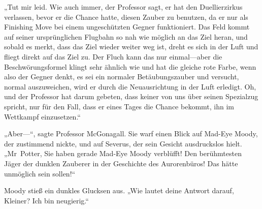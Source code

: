 „Tut mir leid. Wie auch immer, der Professor sagt, er hat den Duellierzirkus verlassen, bevor er die Chance hatte, diesen Zauber zu benutzen, da er nur als Finishing Move bei einem ungeschützten Gegner funktioniert. Das Feld kommt auf seiner ursprünglichen Flugbahn so nah wie möglich an das Ziel heran, und sobald es merkt, dass das Ziel wieder weiter weg ist, dreht es sich in der Luft und fliegt direkt auf das Ziel zu. Der Fluch kann das nur einmal—aber die Beschwörungsformel klingt sehr ähnlich wie  und hat die gleiche rote Farbe, wenn also der Gegner denkt, es sei ein normaler Betäubungszauber und versucht, normal auszuweichen, wird er durch die Neuausrichtung in der Luft erledigt. Oh, und der Professor hat darum gebeten, dass keiner von uns über seinen Spezialzug spricht, nur für den Fall, dass er eines Tages die Chance bekommt, ihn im Wettkampf einzusetzen.“

„Aber—“, sagte Professor McGonagall. Sie warf einen Blick auf Mad-Eye Moody, der zustimmend nickte, und auf Severus, der sein Gesicht ausdruckslos hielt. „Mr~Potter, Sie haben gerade Mad-Eye Moody verblüfft! Den berühmtesten Jäger der dunklen Zauberer in der Geschichte des Aurorenbüros! Das hätte unmöglich sein sollen!“

Moody stieß ein dunkles Glucksen aus. „Wie lautet deine Antwort darauf, Kleiner? Ich bin neugierig.“

